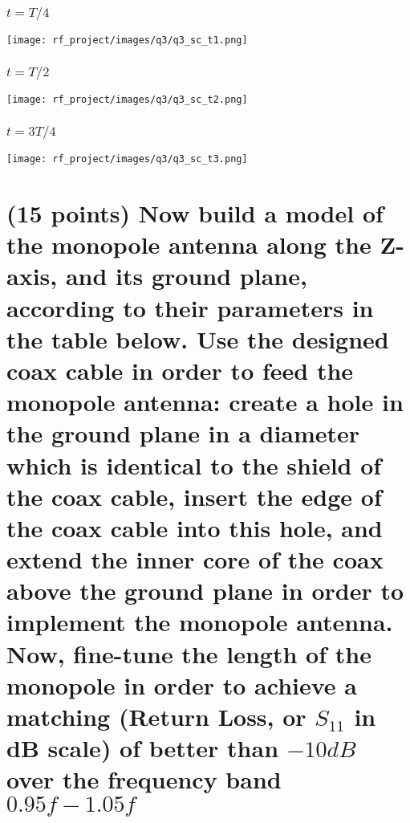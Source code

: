 \documentclass[12pt, letterpaper]{article}
\begin{document}
\subsubsection{$t=T/4$}

\texttt{[image: rf\_project/images/q3/q3\_sc\_t1.png]}

\subsubsection{$t=T/2$}

\texttt{[image: rf\_project/images/q3/q3\_sc\_t2.png]}

\subsubsection{$t=3T/4$}

\texttt{[image: rf\_project/images/q3/q3\_sc\_t3.png]}

\section{(15 points) Now build a model of the monopole antenna along the Z-axis, and its ground plane, according to their parameters in the table below. Use the designed coax cable in order to feed the monopole antenna: create a hole in the ground plane in a diameter which is identical to the shield of the coax cable, insert the edge of the coax cable into this hole, and extend the inner core of the coax above the ground plane in order to implement the monopole antenna. Now, fine-tune the length of the monopole in order to achieve a matching (Return Loss, or $S_{11}$ in dB scale) of better than $-10dB$ over the frequency band $0.95f -1.05f$}
\end{document}
